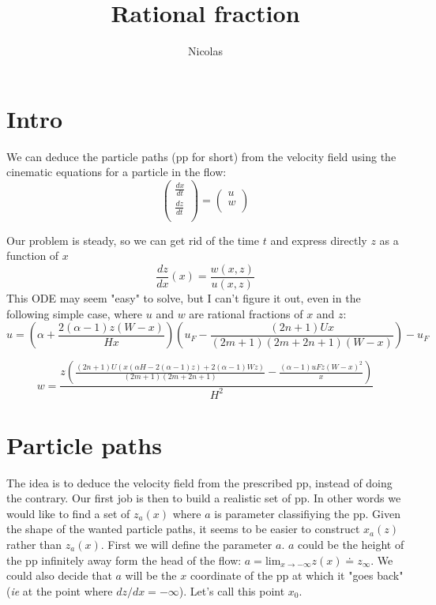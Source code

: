 \documentclass[11pt]{article}
\title{\textbf{Rational fraction}}
\author{Nicolas}
\date{}
\begin{document}
\maketitle

\section{Intro}

We can deduce the particle paths (pp for short) from the velocity field using the cinematic equations for a particle in the flow:
\[
\begin{pmatrix}
	\frac{dx}{dt} \\
	\frac{dz}{dt} \\
\end{pmatrix}
=
\begin{pmatrix}
	u \\
	w \\
\end{pmatrix}
\]

Our problem is steady, so we can get rid of the time $t$ and express directly $z$ as a function of $x$ 
\[
\frac{dz}{dx}(x) = \frac{w(x, z)}{u(x, z)}
\]
This ODE may seem "easy" to solve, but I can't figure it out, even in the following simple case, where $u$ and $w$ are rational fractions of $x$ and $z$:
\[
 u =
 \left(
 \alpha 
 +\frac{2 (\alpha -1) z (W-x)}{H x}
 \right) 
 \left(
 u_F
 -\frac{(2 n+1) U x}{(2 m+1) (2 m+2 n+1) (W-x)}
 \right)-u_F
\]

\[
 w = 
 \frac{z \left(\frac{(2 n+1) U (x (\alpha  H-2 (\alpha -1) z)+2 (\alpha -1) W z)}{(2 m+1) (2 m+2 n+1)}-\frac{(\alpha -1) uF z (W-x)^2}{x}\right)}{H^2}
 \]
 
 
\section{Particle paths}

The idea is to deduce the velocity field from the prescribed pp, instead of doing the contrary.
Our first job is then to build a realistic set of pp. 
In other words we would like to find a set of $z_a(x)$ where $a$ is parameter classifiying the pp.
Given the shape of the wanted particle paths, it seems to be easier to construct $x_a(z)$ rather than $z_a(x)$.
First we will define the parameter $a$. $a$ could be the height of the pp infinitely away form the head of the flow: $a = \text{lim}_{x \rightarrow -\infty} z(x) \doteq z_\infty$. We could also decide that $a$ will be the $x$ coordinate of the pp at which it "goes back" (\textit{ie} at the point where $dz/dx = - \infty$). 
Let's call this point $x_0$.
\end{document}
